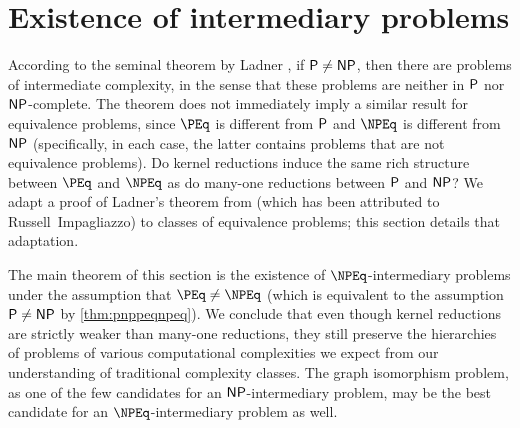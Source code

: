 \section{Existence of intermediary problems}
\label{sec:intermediary}
%
According to the seminal theorem by Ladner \autocite{ladner75}, if $\P \neq \NP$, then there are problems of intermediate complexity, in the sense that these problems are neither in $\P$ nor $\NP$-complete.
The theorem does not immediately imply a similar result for equivalence problems, since $\PEq$ is different from $\P$ and $\NPEq$ is different from $\NP$ (specifically, in each case, the latter contains problems that are not equivalence problems).
Do kernel reductions induce the same rich structure between $\PEq$ and $\NPEq$ as do many-one reductions between $\P$ and $\NP$?
We adapt a proof of Ladner's theorem from \autocite{df03} (which has been attributed to Russell~Impagliazzo) to classes of equivalence problems;
this section details that adaptation.

%
The main theorem of this section is the existence of $\NPEq$-intermediary problems under the assumption that $\PEq \neq \NPEq$ (which is equivalent to the assumption $\P \neq \NP$ by \autoref{thm:pnppeqnpeq}).
We conclude that even though kernel reductions are strictly weaker than many-one reductions, they still preserve the hierarchies of problems of various computational complexities we expect from our understanding of traditional complexity classes.
The graph isomorphism problem, as one of the few candidates for an $\NP$-intermediary problem, may be the best candidate for an $\NPEq$-intermediary problem as well.

